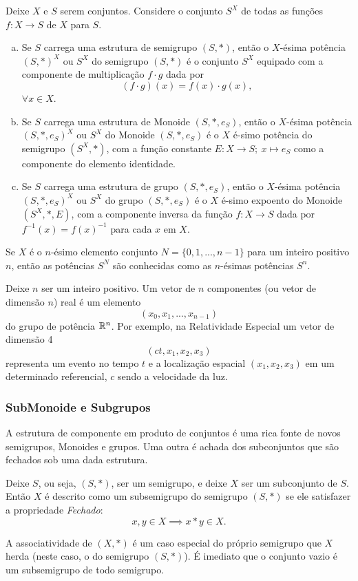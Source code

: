 \begin{definition}
  Deixe $X$ e $S$ serem conjuntos. Considere o conjunto $S^{X}$ de todas as funções $f: X\to S$ de $X$ para $S$.
  \begin{enumerate}[(a)]
    \item Se $S$ carrega uma estrutura de semigrupo $(S,*)$, então o $X$-ésima potência $(S,*)^{X}$ ou $S^{X}$ do semigrupo $(S,*)$ é o conjunto $S^X$ equipado com a componente de multiplicação $f\cdot g$ dada por $$(f\cdot g)(x)=f(x)\cdot g(x),$$ $\forall x \in X$.
    \item Se $S$ carrega uma estrutura de Monoide $(S,*,e_{S})$, então o $X$-ésima potência $(S,*,e_{S})^{X}$ ou $S^X$ do Monoide $(S,*,e_{S})$ é o $X$ é-simo potência do semigrupo $(S^X , *)$, com a função constante $E: X\to S;\ x\mapsto e_{S}$ como a componente do elemento identidade.
    \item Se $S$ carrega uma estrutura de grupo $(S,*,e_{S})$, então o $X$-ésima potência $(S,*,e_{S})^X$ ou $S^X$ do grupo $(S,*,e_{S})$ é o $X$ é-simo expoento do Monoide $(S^X,*,E)$, com a componente inversa da função $f: X\to S$ dada por $f^{-1}(x)=f(x)^{-1}$ para cada $x$ em $X$.
  \end{enumerate}
\end{definition}

Se $X$ é o $n$-ésimo elemento conjunto $N=\{0,1,...,n-1\}$ para um inteiro positivo $n$, então as potências $S^N$ são conhecidas como as $n$-ésimas potências $S^n$.

\begin{exmp}[Vetores]
  Deixe $n$ ser um inteiro positivo. Um vetor de $n$ componentes (ou vetor de dimensão $n$) real é um elemento
  $$(x_{0},x_{1},...,x_{n-1})$$
  do grupo de potência $\mathbb{R}^n$. Por exemplo, na Relatividade Especial um vetor de dimensão 4
  $$(ct,x_{1},x_{2},x_{3})$$
  representa um evento no tempo $t$ e a localização espacial $(x_{1},x_{2},x_{3})$ em um determinado referencial, $c$ sendo a velocidade da luz.
\end{exmp}

\subsubsection{SubMonoide e Subgrupos}
A estrutura de componente em produto de conjuntos é uma rica fonte de novos semigrupos, Monoides e grupos.
Uma outra é achada dos subconjuntos que são fechados sob uma dada estrutura.
\begin{definition}[Subsemigrupos]
  Deixe $S$, ou seja, $(S,*)$, ser um semigrupo, e deixe $X$ ser um subconjunto de $S$. Então $X$ é descrito como um subsemigrupo do semigrupo $(S,*)$ se ele satisfazer a propriedade \emph{Fechado}:
  $$x,y \in X \implies x * y \in X.$$
\end{definition}
A associatividade de $(X, *)$ é um caso especial do próprio semigrupo que $X$ herda (neste caso, o do semigrupo $(S,*)$). É imediato que o conjunto vazio é um subsemigrupo de todo semigrupo.


